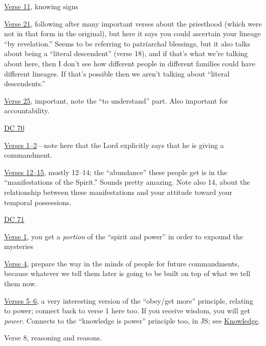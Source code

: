 \begin{compactdesc}
\begin{compactitem}
					\item \hyperref[DC68-11]{Verse 11}, knowing signs
					\item \hyperref[DC68-21]{Verse 21}, following after many important verses about the priesthood (which were not in that form in the original), but here it says you could ascertain your lineage ``by revelation.'' Seems to be referring to patriarchal blessings, but it also talks about being a ``literal descendent'' (verse 18), and if that's what we're talking about here, then I don't see how different people in different families could have different lineages. If that's possible then we aren't talking about ``literal descendents.''
					\item \hyperref[DC68-25]{Verse 25}, important, note the ``to understand'' part. Also important for accountability.
				\end{compactitem}
			\item \hyperref[DC70]{DC 70}
				\begin{compactitem}
					\item \hyperref[DC70-1]{Verses 1--2}---note here that the Lord explicitly says that he is giving a commandment.
					\item \hyperref[DC70-12]{Verses 12--15}, mostly 12--14; the ``abundance'' these people get is in the ``manifestations of the Spirit.'' Sounds pretty amazing. Note also 14, about the relationship between these manifestations and your attitude toward your temporal possessions. 
				\end{compactitem}
			\item \hyperref[DC71]{DC 71}
				\begin{compactitem}
					\item \hyperref[DC71-1]{Verse 1}, you get a \textit{portion} of the ``spirit and power'' in order to expound the mysteries
					\item \hyperref[DC71-4]{Verse 4}, prepare the way in the minds of people for future commandments, because whatever we tell them later is going to be built on top of what we tell them now. 
					\item \hyperref[DC71-5]{Verses 5--6}, a very interesting version of the ``obey/get more'' principle, relating to power; connect back to verse 1 here too. If you receive wisdom, you will get \textit{power}. Connects to the ``knowledge is power'' principle too, in JS; see \hyperref[KNOWLEDGE]{Knowledge}.
					\item[DC71-8]{Verse 8}, reasoning and reasons.
				\end{compactitem}

\end{compactdesc}
